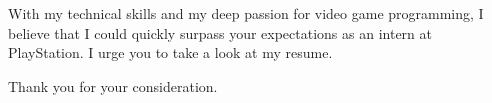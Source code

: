 \documentclass[11pt, letterpaper]{awesome-cv}
\begin{document}
\begin{cvletter}
With my technical skills and my deep passion for video game programming, I believe that I could quickly surpass your expectations as an intern at PlayStation. I urge you to take a look at my resume.

Thank you for your consideration.
\end{cvletter}


\makeletterclosing
\end{document}
